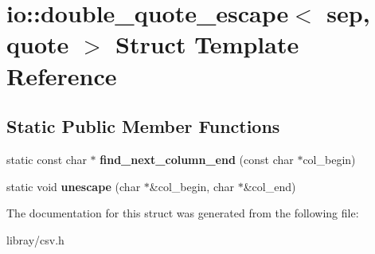 \hypertarget{structio_1_1double__quote__escape}{}\section{io\+:\+:double\+\_\+quote\+\_\+escape$<$ sep, quote $>$ Struct Template Reference}
\label{structio_1_1double__quote__escape}
\subsection*{Static Public Member Functions}
\begin{DoxyCompactItemize}
\item 
\mbox{\label{structio_1_1double__quote__escape_a30070914039ca8a20f716fbf53d68c41}} 
static const char $\ast$ {\bfseries find\+\_\+next\+\_\+column\+\_\+end} (const char $\ast$col\+\_\+begin)
\item 
\mbox{\label{structio_1_1double__quote__escape_a02e332751916fbdb7b35c238d690e580}} 
static void {\bfseries unescape} (char $\ast$\&col\+\_\+begin, char $\ast$\&col\+\_\+end)
\end{DoxyCompactItemize}


The documentation for this struct was generated from the following file\+:\begin{DoxyCompactItemize}
\item 
libray/csv.\+h\end{DoxyCompactItemize}
